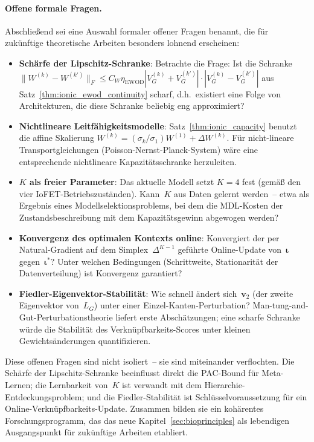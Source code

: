 ﻿\documentclass[12pt, a4paper, openany]{report}
\begin{document}
\paragraph{Offene formale Fragen.}
Abschließend sei eine Auswahl formaler offener Fragen benannt, die für
zukünftige theoretische Arbeiten besonders lohnend erscheinen:
\begin{itemize}
  \item \textbf{Schärfe der Lipschitz-Schranke}: Betrachte die Frage: Ist die Schranke
    $\|W^{(k)} - W^{(k')}\|_F \leq C_W \eta_{\text{EWOD}}
    |V_G^{(k)} + V_G^{(k')}| \cdot |V_G^{(k)} - V_G^{(k')}|$
    aus Satz~\ref{thm:ionic_ewod_continuity} scharf, d.h.\ existiert eine
    Folge von Architekturen, die diese Schranke beliebig eng approximiert?
  \item \textbf{Nichtlineare Leitfähigkeitsmodelle}: Satz~\ref{thm:ionic_capacity}
    benutzt die affine Skalierung $W^{(k)} = (\sigma_k/\sigma_1) W^{(1)} + \Delta W^{(k)}$.
    Für nicht-lineare Transportgleichungen (Poisson-Nernst-Planck-System) wäre
    eine entsprechende nichtlineare Kapazitätsschranke herzuleiten.
  \item \textbf{$K$ als freier Parameter}: Das aktuelle Modell setzt $K=4$
    fest (gemäß den vier IoFET-Betriebszuständen). Kann~$K$ aus Daten gelernt
    werden~-- etwa als Ergebnis eines Modellselektionsproblems, bei dem die
    MDL-Kosten der Zustandsbeschreibung mit dem Kapazitätsgewinn abgewogen werden?
  \item \textbf{Konvergenz des optimalen Kontexts online}: Konvergiert
    der per Natural-Gradient auf dem Simplex~$\Delta^{K-1}$ geführte
    Online-Update von~$\bm{\iota}$ gegen~$\bm{\iota}^*$?  Unter welchen
    Bedingungen (Schrittweite, Stationarität der Datenverteilung) ist
    Konvergenz garantiert?
  \item \textbf{Fiedler-Eigenvektor-Stabilität}: Wie schnell ändert sich~$\bm{v}_2$
    (der zweite Eigenvektor von~$L_G$) unter einer Einzel-Kanten-Perturbation?
    Man-tung-and-Gut-Perturbations\-theorie \cite{chung97} liefert erste
    Abschätzungen; eine scharfe Schranke würde die Stabilität des
    Verknüpfbarkeits-Scores unter kleinen Gewichtsänderungen quantifizieren.
\end{itemize}
Diese offenen Fragen sind nicht isoliert~-- sie sind miteinander verflochten.
Die Schärfe der Lipschitz-Schranke beeinflusst direkt die PAC-Bound für
Meta-Lernen; die Lernbarkeit von~$K$ ist verwandt mit dem Hierarchie-Entdeckungs\-problem;
und die Fiedler-Stabilität ist Schlüsselvoraussetzung für ein
Online-Verknüpfbarkeits-Update.  Zusammen bilden sie ein kohärentes
Forschungsprogramm, das das neue Kapitel~\ref{sec:bioprinciples} als
lebendigen Ausgangspunkt für zukünftige Arbeiten etabliert.
\end{document}
